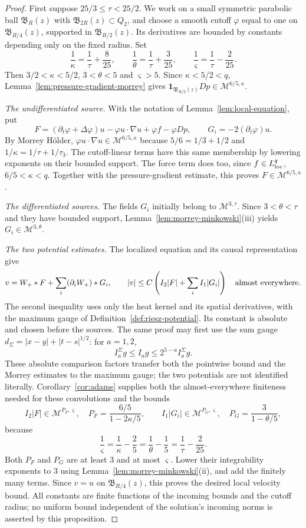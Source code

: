 \documentclass[11pt,reqno]{amsart}
\begin{document}
\begin{proof}
First suppose $25/3\le\tau<25/2$. We work on a small symmetric
parabolic ball $\mathfrak B_R(z)$ with
$\mathfrak B_{2R}(z)\subset Q_2$, and choose a smooth cutoff $\varphi$
equal to one on $\mathfrak B_{R/4}(z)$, supported in
$\mathfrak B_{R/2}(z)$. Its derivatives are bounded by constants depending
only on the fixed radius. Set
\[
 \frac1\kappa=\frac1\tau+\frac8{25},\qquad
 \frac1\theta=\frac1\tau+\frac3{25},\qquad
 \frac1\varsigma=\frac1\tau-\frac2{25}.
\]
Then $3/2<\kappa<5/2$, $3<\theta<5$ and $\varsigma>5$.
Since $\kappa<5/2<q$, Lemma~\ref{lem:pressure-gradient-morrey} gives
$\mathbf1_{\mathfrak B_{R/2}(z)}Dp\in\mathcal M^{6/5,\kappa}$.

\emph{The undifferentiated source.}
With the notation of Lemma~\ref{lem:local-equation}, put
\[
 F=(\partial_t\varphi+\Delta\varphi)u
           -\varphi u\cdot\nabla u+\varphi f-\varphi Dp,
 \qquad G_i=-2(\partial_i\varphi)u .
\]
By Morrey H\"older,
$\varphi u\cdot\nabla u\in\mathcal M^{6/5,\kappa}$ because
$5/6=1/3+1/2$ and $1/\kappa=1/\tau+1/\tau_3$.
The cutoff-linear terms have this same membership by lowering exponents
on their bounded support. The force term does too, since
$f\in L^q_{\rm loc}$, $6/5<\kappa<q$.
Together with the pressure-gradient estimate, this proves
$F\in\mathcal M^{6/5,\kappa}$.

\emph{The differentiated sources.}
The fields $G_i$ initially belong to $\mathcal M^{3,\tau}$.
Since $3<\theta<\tau$ and they have bounded support,
Lemma~\ref{lem:morrey-minkowski}(iii) yields
$G_i\in\mathcal M^{3,\theta}$.

\emph{The two potential estimates.}
The localized equation and its causal representation give
\[
 v=W_+*F+\sum_i(\partial_i W_+)*G_i,\qquad
 |v|\le C\left(I_2|F|+\sum_i I_1|G_i|\right)
 \quad\hbox{almost everywhere}.
\]
The second inequality uses only the heat kernel and its spatial
derivatives, with the maximum gauge of Definition~\ref{def:riesz-potential}.
Its constant is absolute and chosen before the sources. The same proof
may first use the sum gauge $d_\Sigma=|x-y|+|t-s|^{1/2}$: for $a=1,2$,
\[
 I_a^\Sigma g\le I_a g\le 2^{5-a}I_a^\Sigma g .
\]
These absolute comparison factors transfer both the pointwise bound and
the Morrey estimates to the maximum gauge; the two potentials are not
identified literally.
Corollary~\ref{cor:adams} supplies both the almost-everywhere finiteness
needed for these convolutions and the bounds
\[
 I_2|F|\in\mathcal M^{P_F,\varsigma},
 \quad P_F=\frac{6/5}{1-2\kappa/5},\qquad
 I_1|G_i|\in\mathcal M^{P_G,\varsigma},
 \quad P_G=\frac{3}{1-\theta/5},
\]
because
\[
 \frac1\varsigma=\frac1\kappa-\frac25
                =\frac1\theta-\frac15=\frac1\tau-\frac2{25}.
\]
Both $P_F$ and $P_G$ are at least $3$ and at most $\varsigma$.
Lower their integrability exponents to $3$ using
Lemma~\ref{lem:morrey-minkowski}(ii), and add the finitely many terms.
Since $v=u$ on $\mathfrak B_{R/4}(z)$, this proves the desired local
velocity bound. All constants are finite functions of the incoming
bounds and the cutoff radius; no uniform bound independent of the
solution's incoming norms is asserted by this proposition.


\end{proof}
\end{document}
